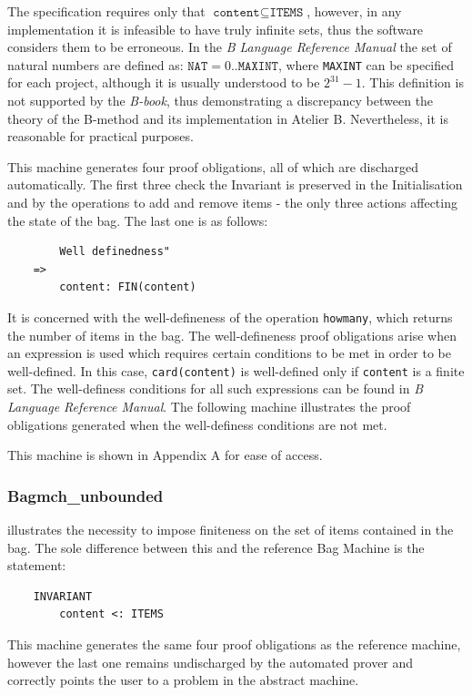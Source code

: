 \documentclass[12pt,journal,duplex]{IEEEtran}
\begin{document}
	The specification requires only that $\texttt{content} \subseteq \texttt{ITEMS}$, however, in any implementation it is infeasible to have truly infinite sets, thus the software considers them to be erroneous. In the \emph{B Language Reference Manual}\cite{b reference} the set of natural numbers are defined as: ${\texttt{NAT}  = 0 .. \texttt{MAXINT}}$, where \texttt{MAXINT} can be specified for each project, although it is usually understood to be $2^{31}-1$. This definition is not supported by the \emph{B-book}, thus demonstrating a discrepancy between the theory of the B-method and its implementation in Atelier B. Nevertheless, it is reasonable for practical purposes.

	This machine generates four proof obligations, all of which are discharged automatically. The first three check the Invariant is preserved in the Initialisation and by the operations to add and remove items - the only three actions affecting the state of the bag. The last one is as follows:

	\begin{lstlisting}
		Well definedness"
	=>
		content: FIN(content)
	\end{lstlisting}

	It is concerned with the well-defineness of the operation \texttt{howmany}, which returns the number of items in the bag. The well-defineness proof obligations arise when an expression is used which requires certain conditions to be met in order to be well-defined. In this case, \texttt{card(content)} is well-defined only if \texttt{content} is a finite set. The well-definess conditions for all such expressions can be found in \emph{B Language Reference Manual}\cite{b reference}. The following machine illustrates the proof obligations generated when the well-definess conditions are not met.

	This machine is shown in Appendix A for ease of access.

	\subsubsection{Bagmch\_unbounded} illustrates the necessity to impose finiteness on the set of items contained in the bag. The sole difference between this and the reference Bag Machine is the statement:

	\begin{lstlisting}
	INVARIANT
		content <: ITEMS
	\end{lstlisting}
	This machine generates the same four proof obligations as the reference machine, however the last one remains undischarged by the automated prover and correctly points the user to a problem in the abstract machine.
\end{document}
